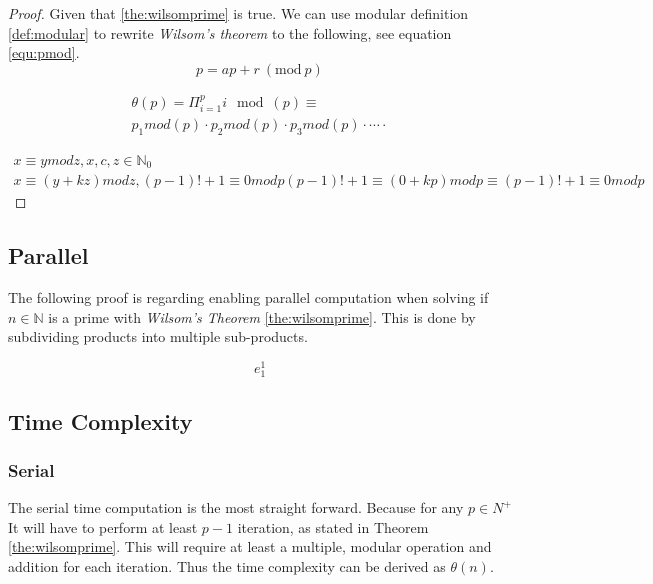 \documentclass[12pt, oneside, onecolumn]{article}
\newcommand{\Mod}[1]{\ (\mathrm{mod}\ #1)}
\begin{document}
\begin{proof}
Given that \ref{the:wilsomprime} is true. We can use modular definition \ref{def:modular} to rewrite \emph{Wilsom's theorem} to the following, see equation \ref{equ:pmod}.
%
\begin{equation}\label{equ:pmod}
p = ap + r \Mod{p}
\end{equation}

%
\begin{equation}\label{equ:}
\begin{split}
\theta(p) = \Pi_{i = 1}^{p} i\mod(p)	\!
\equiv									\\
p_1mod(p)\cdot p_2mod(p) \cdot p_3mod(p) \cdot\cdots\cdot
\end{split}
\end{equation}

%
\begin{equation}
\begin{split}
x\equiv ymodz, x,c,z \in \mathbb{N}_{0} \\
x\equiv (y + kz)mod z,						
(p -1)!+1\equiv0modp
(p-1)!+1\equiv(0+kp)modp
\equiv (p-1)!+1\equiv 0 mod p
\end{split}
\end{equation}

\end{proof}

% 
\subsection{Parallel}
The following proof is regarding enabling parallel computation when solving if $n \in \mathbb{N}$ is a prime with \emph{Wilsom's Theorem} \ref{the:wilsomprime}. This is done by subdividing products into multiple sub-products.

\begin{equation}
e_{1}^{1}
\end{equation}

%
\subsection{Time Complexity}
\subsubsection{Serial}\label{sec:time:serial}
The serial time computation is the most straight forward. Because for any $p \in{N}^+$ It will have to perform at least $p - 1$ iteration, as stated in Theorem \ref{the:wilsomprime}. This will require at least a multiple, modular operation and addition for each iteration. Thus the time complexity can be derived as $\theta(n)$.
\end{document}
